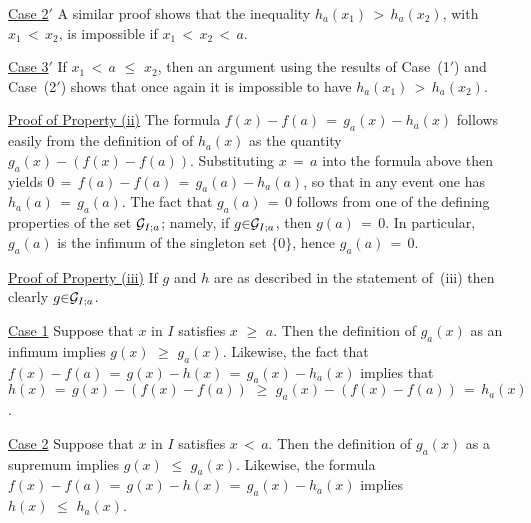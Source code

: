         \underline{Case 2$'$} A similar proof shows that the inequality $h_{a}(x_{1})\,>\,h_{a}(x_{2})$, with $x_{1}\,<\,x_{2}$, is impossible if $x_{1}\,<\,x_{2}\,<\,a$.


        \underline{Case 3$'$} If $x_{1}\,<\,a\,\,{\leq}\,\,x_{2}$, then an argument using the results of Case~(1$'$) and Case~(2$'$) shows that once again it is impossible to have $h_{a}(x_{1})\,>\,h_{a}(x_{2})$.

\V

        \underline{Proof of Property (ii)} The formula $f(x)-f(a) \,=\, g_{a}(x)-h_{a}(x)$ follows easily from the definition of of $h_{a}(x)$ as the quantity $g_{a}(x)-(f(x)-f(a))$.
    Substituting $x \,=\, a$ into the formula above then yields
        $0 \,=\, f(a)-f(a) \,=\, g_{a}(a)-h_{a}(a)$,
    so that in any event one has $h_{a}(a) \,=\, g_{a}(a)$.
    The fact that $g_{a}(a) \,=\, 0$ follows from one of the defining properties of the set ${\cal G}_{I;a}$;
    namely, if $g{\in}{\cal G}_{I;a}$, then $g(a) \,=\, 0$.
    In particular, $g_{a}(a)$ is the infimum of the singleton set $\{0\}$, hence $g_{a}(a) \,=\, 0$.

\V

        \underline{Proof of Property (iii)} If $g$ and $h$ are as described in the statement of~(iii) then clearly $g{\in}{\cal G}_{I;a}$.

        \underline{Case 1} Suppose that $x$ in $I$ satisfies $x\,\,{\geq}\,\,a$.
    Then the definition of $g_{a}(x)$ as an infimum implies $g(x)\,\,{\geq}\,\,g_{a}(x)$.
    Likewise, the fact that $f(x)-f(a) \,=\, g(x)-h(x) \,=\, g_{a}(x)-h_{a}(x)$ implies that $h(x) \,=\, g(x)-(f(x)-f(a))\,\,{\geq}\,\,g_{a}(x)-(f(x)-f(a)) \,=\, h_{a}(x)$.

        \underline{Case 2} Suppose that $x$ in $I$ satisfies $x\,<\,a$. Then the definition of $g_{a}(x)$ as a supremum implies $g(x)\,\,{\leq}\,\,g_{a}(x)$.
    Likewise, the formula $f(x)-f(a) \,=\, g(x)-h(x) \,=\, g_{a}(x)-h_{a}(x)$ implies $h(x)\,\,{\leq}\,\,h_{a}(x)$.

\V


